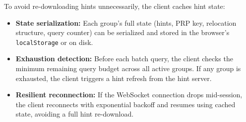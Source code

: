 To avoid re-downloading hints unnecessarily, the client caches hint state:
\begin{itemize}[nolistsep,leftmargin=*]
    \item \textbf{State serialization:} Each group's full state (hints, PRP key, relocation structure, query counter) can be serialized and stored in the browser's \texttt{localStorage} or on disk.
    \item \textbf{Exhaustion detection:} Before each batch query, the client checks the minimum remaining query budget across all active groups. If any group is exhausted, the client triggers a hint refresh from the hint server.
    \item \textbf{Resilient reconnection:} If the WebSocket connection drops mid-session, the client reconnects with exponential backoff and resumes using cached state, avoiding a full hint re-download.
\end{itemize}

